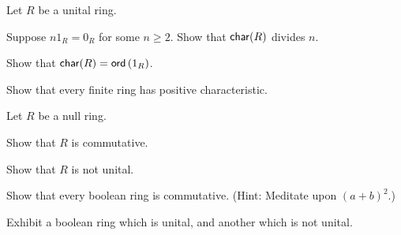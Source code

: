 \begin{exercise}
Let \(R\) be a unital ring.
\begin{proplist}
\item Suppose \(n1_R = 0_R\) for some \(n \geq 2\). Show that \(\mathsf{char}(R)\) divides \(n\).
\item Show that \(\mathsf{char}(R) = \mathsf{ord}\left(1_R\right)\).
\end{proplist}
\end{exercise}

\begin{exercise}
Show that every finite ring has positive characteristic.
\end{exercise}

\begin{exercise}
Let \(R\) be a null ring.
\begin{proplist*}
\item Show that \(R\) is commutative.
\item Show that \(R\) is not unital.
\end{proplist*}
\end{exercise}

\begin{exercise}
Show that every boolean ring is commutative. (Hint: Meditate upon \((a+b)^2\).)
\end{exercise}

\begin{exercise}
Exhibit a boolean ring which is unital, and another which is not unital.
\end{exercise}

